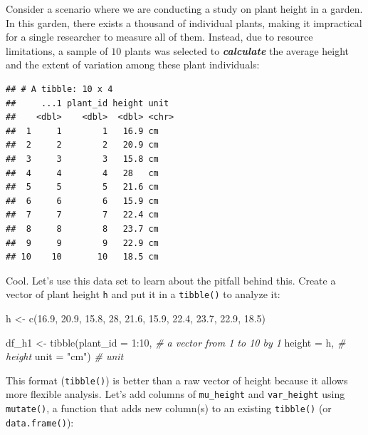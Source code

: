 \documentclass[
]{book}
\newenvironment{Shaded}{\begin{snugshade}}{\end{snugshade}}
\newcommand{\AttributeTok}[1]{\textcolor[rgb]{0.77,0.63,0.00}{#1}}
\newcommand{\CommentTok}[1]{\textcolor[rgb]{0.56,0.35,0.01}{\textit{#1}}}
\newcommand{\DecValTok}[1]{\textcolor[rgb]{0.00,0.00,0.81}{#1}}
\newcommand{\FloatTok}[1]{\textcolor[rgb]{0.00,0.00,0.81}{#1}}
\newcommand{\FunctionTok}[1]{\textcolor[rgb]{0.00,0.00,0.00}{#1}}
\newcommand{\NormalTok}[1]{#1}
\newcommand{\OtherTok}[1]{\textcolor[rgb]{0.56,0.35,0.01}{#1}}
\newcommand{\SpecialCharTok}[1]{\textcolor[rgb]{0.00,0.00,0.00}{#1}}
\newcommand{\StringTok}[1]{\textcolor[rgb]{0.31,0.60,0.02}{#1}}
\begin{document}
Consider a scenario where we are conducting a study on plant height in a garden. In this garden, there exists a thousand of individual plants, making it impractical for a single researcher to measure all of them. Instead, due to resource limitations, a sample of \(10\) plants was selected to \textbf{\emph{calculate}} the average height and the extent of variation among these plant individuals:

\begin{verbatim}
## # A tibble: 10 x 4
##     ...1 plant_id height unit 
##    <dbl>    <dbl>  <dbl> <chr>
##  1     1        1   16.9 cm   
##  2     2        2   20.9 cm   
##  3     3        3   15.8 cm   
##  4     4        4   28   cm   
##  5     5        5   21.6 cm   
##  6     6        6   15.9 cm   
##  7     7        7   22.4 cm   
##  8     8        8   23.7 cm   
##  9     9        9   22.9 cm   
## 10    10       10   18.5 cm
\end{verbatim}

Cool. Let's use this data set to learn about the pitfall behind this. Create a vector of plant height \texttt{h} and put it in a \texttt{tibble()} to analyze it:

\begin{Shaded}
\begin{Highlighting}[]
\NormalTok{h }\OtherTok{\textless{}{-}} \FunctionTok{c}\NormalTok{(}\FloatTok{16.9}\NormalTok{, }\FloatTok{20.9}\NormalTok{, }\FloatTok{15.8}\NormalTok{, }\DecValTok{28}\NormalTok{, }\FloatTok{21.6}\NormalTok{, }\FloatTok{15.9}\NormalTok{, }\FloatTok{22.4}\NormalTok{, }\FloatTok{23.7}\NormalTok{, }\FloatTok{22.9}\NormalTok{, }\FloatTok{18.5}\NormalTok{)}

\NormalTok{df\_h1 }\OtherTok{\textless{}{-}} \FunctionTok{tibble}\NormalTok{(}\AttributeTok{plant\_id =} \DecValTok{1}\SpecialCharTok{:}\DecValTok{10}\NormalTok{, }\CommentTok{\# a vector from 1 to 10 by 1}
                \AttributeTok{height =}\NormalTok{ h, }\CommentTok{\# height}
                \AttributeTok{unit =} \StringTok{"cm"}\NormalTok{) }\CommentTok{\# unit}
\end{Highlighting}
\end{Shaded}

This format (\texttt{tibble()}) is better than a raw vector of height because it allows more flexible analysis. Let's add columns of \texttt{mu\_height} and \texttt{var\_height} using \texttt{mutate()}, a function that adds new column(s) to an existing \texttt{tibble()} (or \texttt{data.frame()}):
\end{document}
